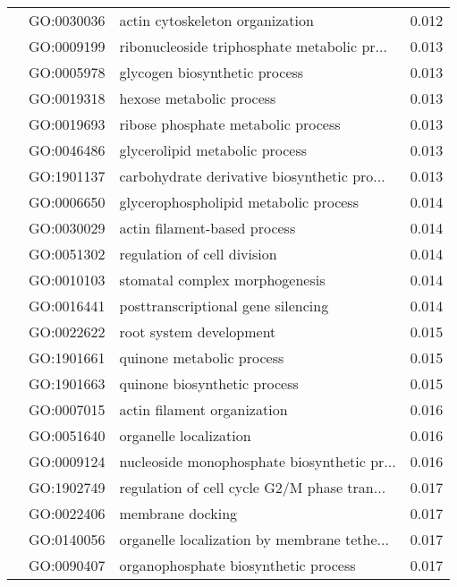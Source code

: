 \begin{longtable}{lllr}
   & GO:0030036 &              actin cytoskeleton organization &         0.012 \\
   & GO:0009199 &  ribonucleoside triphosphate metabolic pr... &         0.013 \\
   & GO:0005978 &                glycogen biosynthetic process &         0.013 \\
   & GO:0019318 &                     hexose metabolic process &         0.013 \\
   & GO:0019693 &           ribose phosphate metabolic process &         0.013 \\
   & GO:0046486 &               glycerolipid metabolic process &         0.013 \\
   & GO:1901137 &  carbohydrate derivative biosynthetic pro... &         0.013 \\
   & GO:0006650 &        glycerophospholipid metabolic process &         0.014 \\
   & GO:0030029 &                 actin filament-based process &         0.014 \\
   & GO:0051302 &                  regulation of cell division &         0.014 \\
   & GO:0010103 &               stomatal complex morphogenesis &         0.014 \\
   & GO:0016441 &           posttranscriptional gene silencing &         0.014 \\
   & GO:0022622 &                      root system development &         0.015 \\
   & GO:1901661 &                    quinone metabolic process &         0.015 \\
   & GO:1901663 &                 quinone biosynthetic process &         0.015 \\
   & GO:0007015 &                  actin filament organization &         0.016 \\
   & GO:0051640 &                       organelle localization &         0.016 \\
   & GO:0009124 &  nucleoside monophosphate biosynthetic pr... &         0.016 \\
   & GO:1902749 &  regulation of cell cycle G2/M phase tran... &         0.017 \\
   & GO:0022406 &                             membrane docking &         0.017 \\
   & GO:0140056 &  organelle localization by membrane tethe... &         0.017 \\
   & GO:0090407 &         organophosphate biosynthetic process &         0.017 \\

\end{longtable}
